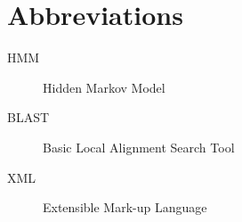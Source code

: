 \chapter*{Abbreviations}\label{abbr}
\begin{description}
	\item[HMM] Hidden Markov Model
	\item[BLAST] Basic Local Alignment Search Tool
	\item[XML] Extensible Mark-up Language
\end{description}
